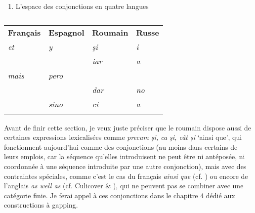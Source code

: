 \begin{enumerate}
\item   \label{bkm:Ref300180933}L'espace des conjonctions en quatre langues


\end{enumerate}

\begin{table}


\begin{tabular}{llll}

 {\bfseries Français}\par & {\bfseries Espagnol}\par & {\bfseries Roumain}\par & {\bfseries Russe}\par\\
 {\itshape et}\par & {\itshape y}\par & {\itshape şi}\par & {\itshape i}\par\\
 &  & {\itshape iar}\par & {\itshape a}\par\\
 {\itshape mais}\par & {\itshape pero}\par &  & \\
 &  & {\itshape dar}\par & {\itshape no}\par\\
\hhline{~---} & {\itshape sino}\par & {\itshape ci}\par & {\itshape a}\par\\
\hhline{~---}

\end{tabular}

\caption{}
\end{table}

Avant de finir cette section, je veux juste préciser que le roumain dispose aussi de certaines expressions lexicalisées comme \textit{precum şi, ca şi, cât şi} `ainsi que', qui fonctionnent aujourd'hui comme des conjonctions (au moins dans certains de leurs emplois, car la séquence qu'elles introduisent ne peut être ni antéposée, ni coordonnée à une séquence introduite par une autre conjonction), mais avec des contraintes spéciales, comme c'est le cas du français \textit{ainsi que} (cf. \citet{Mouret2007}) ou encore de l'anglais \textit{as well as} (cf. Culicover \& \citet{Jackendoff2005}), qui ne peuvent pas se combiner avec une catégorie finie. Je ferai appel à ces conjonctions dans le chapitre 4 dédié aux constructions à gapping. 

